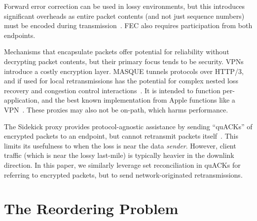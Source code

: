 Forward error correction can be used in lossy environments, but this
introduces significant overheads as entire packet contents (and not just
sequence numbers) must be encoded during transmission~\cite
{rfc9265}. FEC also requires participation from both endpoints.

Mechanisms that encapsulate packets offer potential for reliability without
decrypting packet contents, but their primary focus tends to be security. VPNs
introduce a costly encryption layer. MASQUE tunnels protocols over HTTP/3, and
if used for local retransmissions has the potential for complex nested loss
recovery and congestion control interactions~\cite
{rfc9298,schinazi-masque-proxy-05,kramer2021masquepep}. It is intended to
function per-application, and the best known implementation from Apple
functions like a VPN~\cite{icloud-private-relay}. These proxies may also not be
on-path, which harms performance.

The Sidekick proxy provides protocol-agnostic assistance by sending
``quACKs'' of encrypted packets to an endpoint, but cannot retransmit
packets itself~\cite{yuan2024sidekick}. This limits its usefulness
to when the loss is near the data \textit{sender}.
However, client traffic (which is near the lossy last-mile) is typically heavier
in the downlink direction. In this paper, we similarly leverage set
reconciliation in quACKs for referring to encrypted packets,
but to send network-originated retransmissions.

\section{The Reordering Problem}
\label{sec:packrat:problem}

